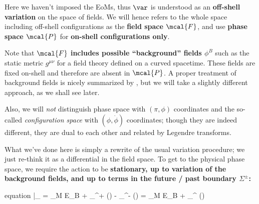 \documentclass[a4paper
	,10pt
]{article}
\begin{document}
	Here we haven't imposed the EoMs, thus $\var$ is understood as an \textbf{off-shell variation} on the space of fields. We will hence refers to the whole space including off-shell configurations as the \textbf{field space $\mcal{F}$}, and use \textbf{phase space $\mcal{P}$} for \textbf{on-shell configurations only}. 
	
	Note that $\mcal{F}$ \textbf{includes possible ``background'' fields $\phi^B$} such as the static metric $g^{\mu\nu}$ for a field theory defined on a curved spacetime. These fields are fixed on-shell and therefore are absent in $\mcal{P}$. A proper treatment of background fields is nicely summarized by \textcite{Banados:2016zim}, but we will take a slightly different approach, as we shall see later. 
	
	Also, we will \textit{not} distinguish phase space with $(\pi,\phi) $ coordinates and the so-called \textit{configuration space} with $(\phi,\dot{\phi})$ coordinates; though they are indeed different, they are dual to each other and related by Legendre transforms. 
	
	What we've done here is simply a rewrite of the usual variation procedure; we just re-think it as a differential in the field space. To get to the physical phase space, we
	require the action to be \textbf{stationary, up to
	variation of the background fields, and
	up to terms in the future / past boundary $\Sigma^\pm$:}
	\begin{empheq}{equation}
		|_{}
		= \int_M E_B 
			+ \int_{\Sigma^+} ({\cdots})
			- \int_{\Sigma^-} ({\cdots})
		= \int_M E_B 
			+ \int_{\Sigma^\pm} ({\cdots})
	\end{empheq}
	
\end{document}
